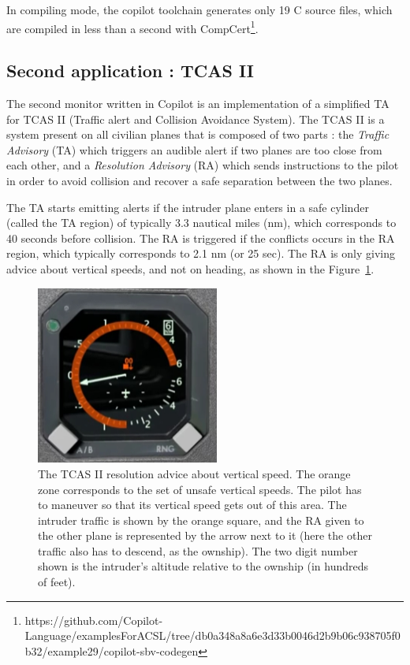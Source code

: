 \documentclass[a4paper,11pt,final]{article}
\begin{document}
	In compiling mode, the copilot toolchain generates only 19 C source files, which are compiled in less than a second with CompCert\footnote{https://github.com/Copilot-Language/examplesForACSL/tree/db0a348a8a6e3d33b0046d2b9b06c938705f0b32/example29/copilot-sbv-codegen}.
	
	\subsection{Second application : TCAS II}
	
	The second monitor written in Copilot is an implementation of a simplified TA for TCAS II (Traffic alert and Collision Avoidance System). The TCAS II is a system present on all civilian planes that is composed of two parts : the \emph{Traffic Advisory} (TA) which triggers an audible alert if two planes are too close from each other, and a \emph{Resolution Advisory} (RA) which sends instructions to the pilot in order to avoid collision and recover a safe separation between the two planes. 
	
	The TA starts emitting alerts if the intruder plane enters in a safe cylinder (called the TA region) of typically 3.3 nautical miles (nm), which corresponds to 40 seconds before collision. The RA is triggered if the conflicts occurs in the RA region, which typically corresponds to 2.1 nm (or 25 sec). The RA is only giving advice about vertical speeds, and not on heading, as shown in the Figure~\ref{fig:TCASRA1}. 
	
	\begin{figure}[!htb]
		\centering
		\includegraphics[width=60mm]{images/TCASRA1.jpg}
		\caption{The TCAS II resolution advice about vertical speed. The orange zone corresponds to the set of unsafe vertical speeds. The pilot has to maneuver so that its vertical speed gets out of this area. The intruder traffic is shown by the orange square, and the RA given to the other plane is represented by the arrow next to it (here the other traffic also has to descend, as the ownship). The two digit number shown is the intruder's altitude relative to the ownship (in hundreds of feet).}
		\label{fig:TCASRA1}
	\end{figure}
	
\end{document}
